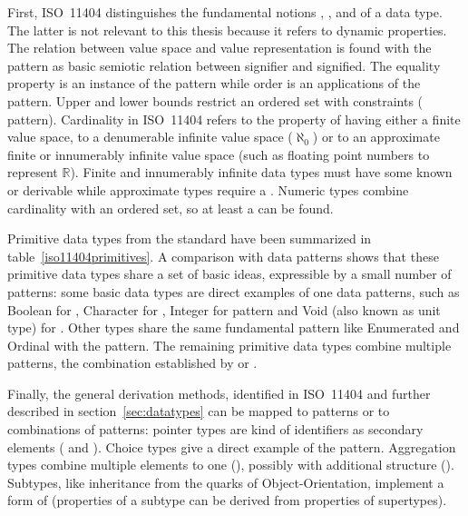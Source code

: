 First, ISO~11404 distinguishes the fundamental notions ,
, and  of a data type. The
latter is not relevant to this thesis because it refers to dynamic properties.
The relation between value space and value representation is found with the
 pattern as basic semiotic relation between signifier and
signified. The equality property is an instance of the 
pattern while order is an applications of the  pattern.
Upper and lower bounds restrict an ordered set with constraints
( pattern).  Cardinality in ISO~11404 refers to the property of
having either a finite value space, to a denumerable infinite value space
($\aleph_0$) or to an approximate finite or innumerably infinite value space (such
as floating point numbers to represent $\mathbb{R}$). Finite and innumerably
infinite data types must have some known or derivable  while
approximate types require a . Numeric types combine
cardinality with an ordered set, so at least a  can be found.

Primitive data types from the standard have been summarized in
table~\ref{iso11404primitives}. A comparison with data patterns shows that
these primitive data types share a set of basic ideas, expressible by a small
number of patterns: some basic data types are direct examples of one data
patterns, such as Boolean for , Character for ,
Integer for  pattern and Void (also known as unit type) for
. Other types share the same fundamental pattern like Enumerated
and Ordinal with the  pattern. The remaining primitive data
types combine multiple patterns, the combination established by
 or .

Finally, the general derivation methods, identified in ISO~11404 and further
described in section~\ref{sec:datatypes} can be mapped to patterns or to
combinations of patterns: pointer types are kind of identifiers as secondary
elements ( and ). Choice types give a
direct example of the  pattern. Aggregation types combine
multiple elements to one (), possibly with additional
structure (). Subtypes, like inheritance from the quarks of
Object-Orientation, implement a form of  (properties of a
subtype can be derived from properties of supertypes).

